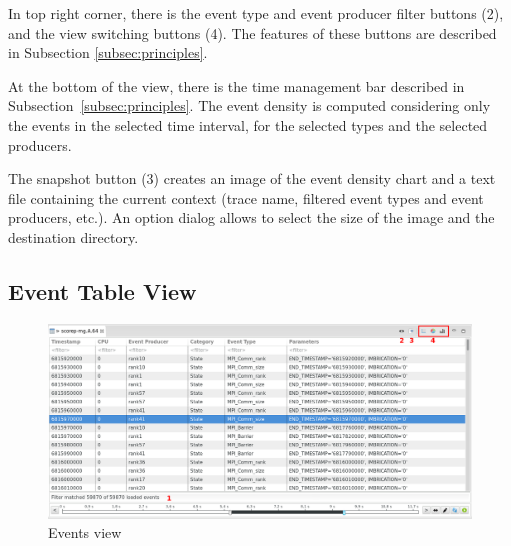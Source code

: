 \documentclass[twoside]{article}
\begin{document}
\begin{sloppypar}
In top right corner, there is the event type and event producer filter buttons (\num{2}), and the view switching buttons (\num{4}). The features of these buttons are described in Subsection \ref{subsec:principles}.

At the bottom of the view, there is the time management bar described in Subsection~\ref{subsec:principles}.
The event density is computed considering only the events in the selected time interval, for the selected types and the selected producers.

The snapshot button (\num{3}) creates an image of the event density chart and a text file containing the current context (trace name, filtered event types and event producers, etc.).
An option dialog allows to select the size of the image and the destination directory.

\subsection{Event Table View}
\label{subsec:table}

\begin{figure}[h!]
  \centering
    \includegraphics[width=1.0\textwidth]{images/table.png}
  \caption{Events view}
  \label{fig:table}
\end{figure}


\end{sloppypar}
\end{document}
